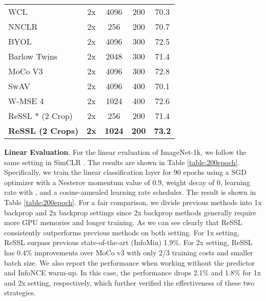 \documentclass{article}
\newcommand{\<}{\left\langle}
\renewcommand{\>}{\right\rangle}
\begin{document}
\begin{table}[h]
\begin{tabular}{l c c c c }
WCL \cite{WCL}   & 2x  & 4096 & 200 & 70.3 \\
NNCLR \cite{nnclr}   & 2x  & 256 & 200 & 70.7 \\ 
BYOL \cite{byol}       & 2x  & 4096 & 300 & 72.5 \\
Barlow Twins \cite{barlowtwins}       & 2x  & 2048 & 300 & 71.4 \\
MoCo V3 \cite{mocov3}  & 2x  & 4096 & 300 & 72.8 \\
SwAV \cite{swav}                         & 2x &  4096 &  400 & 70.1 \\
W-MSE 4 \cite{wmse}   & 2x & 1024 & 400 & 72.6 \\
\textcolor{collapsed}{ReSSL * (2 Crop) \cite{ressl}} & \textcolor{collapsed}{2x}  & \textcolor{collapsed}{256} &  \textcolor{collapsed}{200} & \textcolor{collapsed}{71.4} \\
\textbf{ReSSL (2 Crops)}   & \textbf{2x}  & \textbf{1024} &  \textbf{200} & \textbf{73.2} \\
\bottomrule
\end{tabular}
\vspace{-8pt}
\end{table}



\textbf{Linear Evaluation}.
For the linear evaluation of ImageNet-1k, we follow the same setting in SimCLR \cite{swav}.  The results are shown in Table \ref{table:200epoch}. Specifically, we train the linear classification layer for 90 epochs using a SGD optimizer with a Nesterov momentum value of 0.9, weight decay of 0, learning rate with , and a cosine-annealed learning rate scheduler. The result is shown in Table \ref{table:200epoch}. For a fair comparison, we divide previous methods into 1x backprop and 2x backprop settings since 2x backprop methods generally require more GPU memories and longer training. As we can see clearly that ReSSL consistently outperforms previous methods on both setting. For 1x setting, ReSSL surpass previous state-of-the-art (InfoMin) 1.9\%. For 2x setting, ReSSL has 0.4\% improvements over MoCo v3 with only 2/3 training costs and smaller batch size. We also report the performance when working without the predictor and InfoNCE warm-up. In this case, the performance drops 2.1\% and 1.8\% for 1x and 2x setting, respectively, which further verified the effectiveness of these two strategies.
\end{document}
